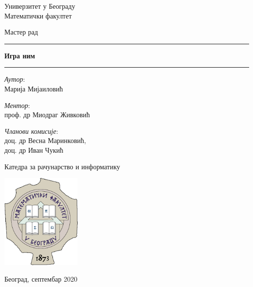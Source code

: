 \begin{titlepage}
    \begin{center}
        \vspace{0.5cm}
        
        \Large{
	        Универзитет у Београду\\
	        Математички факултет\\
        }
    
        \vspace{0.5cm}
        \Large{Мастер рад}    
        
        \vspace{2.0cm}
        
        \Huge
        \rule[0.5cm]{\textwidth}{0.5pt}
        \textbf{Игра ним}
        \rule{\textwidth}{0.5pt}
        \vspace{0.5cm}
        
        \vspace{2.0cm}
        
        \begin{minipage}[t]{0.47\textwidth}
        	\textnormal{\large{\textit{Аутор}:\\}}
        	{\large Марија Мијаиловић}
        \end{minipage}\hfill\begin{minipage}[t]{0.47\textwidth}\raggedleft
        	\textnormal{\large{\textit{Ментор}:\\}}
        	{\large проф. др Миодраг Живковић\\}
        	
        	\vspace*{15pt}
        	
        	{\large{\textit{Чланови комисије}:\\}} 
        	{\large доц. др Весна Маринковић,\\}
        	{\large доц. др Иван Чукић\\}
        \end{minipage}
        
        \vfill
        
        {\Large Катедра за рачунарство и информатику}
        
        \vspace{0.8cm}
        
        \includegraphics[width=0.3\textwidth]{matf_logo.png}
        
        \large{Београд, септембар 2020}
        
    \end{center}
\end{titlepage}